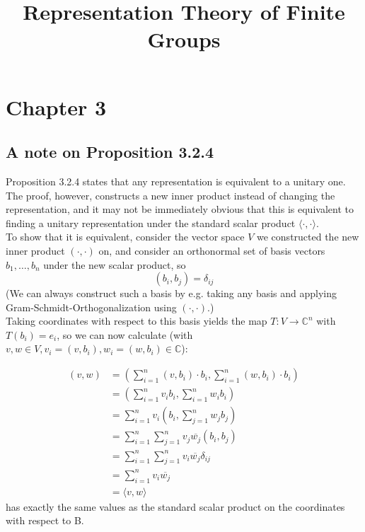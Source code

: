 \documentclass[12pt]{article}
\begin{document}
 
\title{Representation Theory of Finite Groups}
\author{}
\date{}
\maketitle

\section*{Chapter 3}

\subsection*{A note on Proposition 3.2.4}

Proposition 3.2.4 states that any representation is equivalent to a unitary one. The proof, however, constructs a new inner product instead of changing the representation, and it may not be immediately obvious that this is equivalent to finding a unitary representation under the standard scalar product $\langle\cdot,\cdot\rangle$.\\
To show that it is equivalent, consider the vector space $V$ we constructed the new inner product $(\cdot,\cdot)$ on, and consider an orthonormal set of basis vectors $b_1,\dots,b_n$ under the new scalar product, so
\begin{equation*}
    (b_i,b_j) = \delta_{ij}
\end{equation*}
(We can always construct such a basis by e.g. taking any basis and applying Gram-Schmidt-Orthogonalization using $(\cdot,\cdot)$.)\\
Taking coordinates with respect to this basis yields the map $T: V \longrightarrow \mathbb{C}^n$ with $T(b_i) = e_i$, so we can now calculate (with $v,w \in V, v_i = (v,b_i), w_i = (w,b_i) \in \mathbb{C}$):

\begin{equation*}
    \begin{split}
        (v,w) &= (\sum_{i=1}^n (v,b_i) \cdot b_i, \sum_{i=1}^n (w,b_i) \cdot b_i)\\
        &= (\sum_{i=1}^n v_i b_i, \sum_{i=1}^n w_i b_i)\\
        &= \sum_{i=1}^n v_i (b_i, \sum_{j=1}^n w_j b_j)\\
        &= \sum_{i=1}^n \sum_{j=1}^n v_j \overline{w_j} (b_i, b_j)\\
        &= \sum_{i=1}^n \sum_{j=1}^n v_i \overline{w_j} \delta_{ij}\\
        &= \sum_{i=1}^n  v_i \overline{w_j}\\
        &= \langle v,w \rangle
    \end{split}
\end{equation*}
has exactly the same values as the standard scalar product on the coordinates with respect to B.
\end{document}
